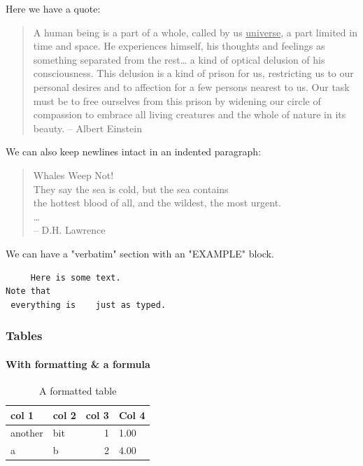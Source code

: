 \documentclass[11pt]{article}
\begin{document}
Here we have a quote:
\begin{quote}
A human being is a part of a whole, called by us \uline{universe}, a part limited in time and space. He experiences himself, his thoughts and feelings as something
separated from the rest\ldots{} a kind of optical delusion of his consciousness. This delusion is a kind of prison for us, restricting us to our personal desires
and to affection for a few persons nearest to us. Our task must be to free ourselves from this prison by widening our circle of compassion to embrace all
living creatures and the whole of nature in its beauty. -- Albert Einstein
\end{quote}

We can also keep newlines intact in an indented paragraph:
\begin{verse}
Whales Weep Not!\\
\vspace*{1em}
They say the sea is cold, but the sea contains\\
the hottest blood of all, and the wildest, the most urgent.\\
\ldots{}\\
\vspace*{1em}
\hspace*{3em}-- D.H. Lawrence\\
\end{verse}

We can have a "verbatim" section with an "EXAMPLE" block.
\begin{verbatim}
     Here is some text.
Note that
 everything is    just as typed.
\end{verbatim}

\subsubsection{Tables}
\label{sec:org66c0139}

\paragraph{With formatting \& a formula}
\label{sec:orgf9e2d12}

\begin{table}[htbp]
\caption{A formatted table}
\centering
\begin{tabular}{l|l|rl}
\hline
col 1 & col 2 & col 3 & Col 4\\
\hline
another & bit & 1 & 1.00\\
a & b & 2 & 4.00\\
\hline
\end{tabular}
\end{table}
\end{document}
